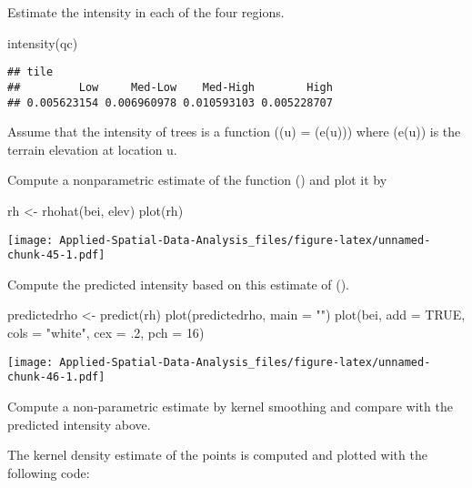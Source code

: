\documentclass[
]{book}
\newenvironment{Shaded}{\begin{snugshade}}{\end{snugshade}}
\newcommand{\AttributeTok}[1]{\textcolor[rgb]{0.77,0.63,0.00}{#1}}
\newcommand{\ConstantTok}[1]{\textcolor[rgb]{0.00,0.00,0.00}{#1}}
\newcommand{\DecValTok}[1]{\textcolor[rgb]{0.00,0.00,0.81}{#1}}
\newcommand{\FunctionTok}[1]{\textcolor[rgb]{0.00,0.00,0.00}{#1}}
\newcommand{\NormalTok}[1]{#1}
\newcommand{\OtherTok}[1]{\textcolor[rgb]{0.56,0.35,0.01}{#1}}
\newcommand{\StringTok}[1]{\textcolor[rgb]{0.31,0.60,0.02}{#1}}
\begin{document}
Estimate the intensity in each of the four regions.

\begin{Shaded}
\begin{Highlighting}[]
\FunctionTok{intensity}\NormalTok{(qc)}
\end{Highlighting}
\end{Shaded}

\begin{verbatim}
## tile
##         Low     Med-Low    Med-High        High 
## 0.005623154 0.006960978 0.010593103 0.005228707
\end{verbatim}

Assume that the intensity of trees is a function (\lambda(u) = \rho(e(u))) where (e(u)) is the terrain elevation at location u.

Compute a nonparametric estimate of the function (\rho) and plot it by

\begin{Shaded}
\begin{Highlighting}[]
\NormalTok{rh }\OtherTok{\textless{}{-}} \FunctionTok{rhohat}\NormalTok{(bei, elev)}
\FunctionTok{plot}\NormalTok{(rh)}
\end{Highlighting}
\end{Shaded}

\texttt{[image: Applied-Spatial-Data-Analysis\_files/figure-latex/unnamed-chunk-45-1.pdf]}

Compute the predicted intensity based on this estimate of (\rho).

\begin{Shaded}
\begin{Highlighting}[]
\NormalTok{predictedrho }\OtherTok{\textless{}{-}} \FunctionTok{predict}\NormalTok{(rh)}
\FunctionTok{plot}\NormalTok{(predictedrho, }\AttributeTok{main =} \StringTok{""}\NormalTok{)}
\FunctionTok{plot}\NormalTok{(bei, }\AttributeTok{add =} \ConstantTok{TRUE}\NormalTok{, }\AttributeTok{cols =} \StringTok{"white"}\NormalTok{, }\AttributeTok{cex =}\NormalTok{ .}\DecValTok{2}\NormalTok{, }\AttributeTok{pch =} \DecValTok{16}\NormalTok{)}
\end{Highlighting}
\end{Shaded}

\texttt{[image: Applied-Spatial-Data-Analysis\_files/figure-latex/unnamed-chunk-46-1.pdf]}

Compute a non-parametric estimate by kernel smoothing and compare with the predicted intensity above.

The kernel density estimate of the points is computed and plotted with the following code:
\end{document}
